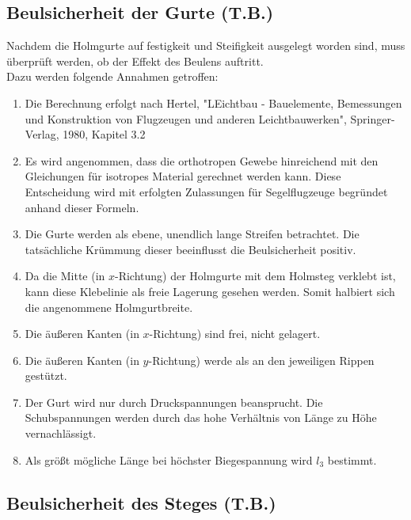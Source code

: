 \subsection{Beulsicherheit der Gurte (T.B.)}
Nachdem die Holmgurte auf festigkeit und Steifigkeit ausgelegt worden sind, muss überprüft werden, ob der Effekt des Beulens auftritt.\\

\noindent Dazu werden folgende Annahmen getroffen:

\begin{enumerate}
	\item Die Berechnung erfolgt nach Hertel, "LEichtbau - Bauelemente, Bemessungen und Konstruktion von Flugzeugen und anderen Leichtbauwerken", Springer-Verlag, 1980, Kapitel 3.2
	\item Es wird angenommen, dass die orthotropen Gewebe hinreichend mit den Gleichungen für isotropes Material gerechnet werden kann. Diese Entscheidung wird mit erfolgten Zulassungen für Segelflugzeuge begründet anhand dieser Formeln.
	\item Die Gurte werden als ebene, unendlich lange Streifen betrachtet. Die tatsächliche Krümmung dieser beeinflusst die Beulsicherheit positiv.
	\item Da die Mitte (in $x$-Richtung) der Holmgurte mit dem Holmsteg verklebt ist, kann diese Klebelinie als freie Lagerung gesehen werden. Somit halbiert sich die angenommene Holmgurtbreite.
	\item Die äußeren Kanten (in $x$-Richtung) sind frei, nicht gelagert.
	\item Die äußeren Kanten (in $y$-Richtung) werde als an den jeweiligen Rippen gestützt.
	\item Der Gurt wird nur durch Druckspannungen beansprucht. Die Schubspannungen werden durch das hohe Verhältnis von Länge zu  Höhe vernachlässigt.
	\item Als größt mögliche Länge bei höchster Biegespannung wird $l_{3}$ bestimmt.
\end{enumerate}

\subsection{Beulsicherheit des Steges (T.B.)}